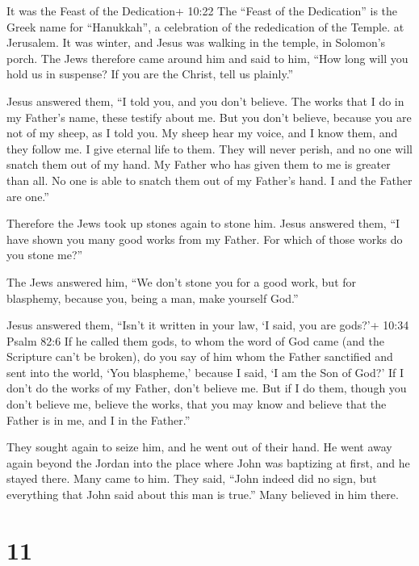 It was the Feast of the Dedication+ 10:22 The ``Feast of
the Dedication'' is the Greek name for ``Hanukkah'', a celebration of
the rededication of the Temple. at Jerusalem.  It was
winter, and Jesus was walking in the temple, in Solomon's porch.
 The Jews therefore came around him and said to him, ``How
long will you hold us in suspense? If you are the Christ, tell us
plainly.''

 Jesus answered them, ``I told you, and you don't believe.
The works that I do in my Father's name, these testify about me.
 But you don't believe, because you are not of my sheep, as
I told you.  My sheep hear my voice, and I know them, and
they follow me.  I give eternal life to them. They will
never perish, and no one will snatch them out of my hand. 
My Father who has given them to me is greater than all. No one is able
to snatch them out of my Father's hand.  I and the Father
are one.''

 Therefore the Jews took up stones again to stone him.
 Jesus answered them, ``I have shown you many good works
from my Father. For which of those works do you stone me?''

 The Jews answered him, ``We don't stone you for a good
work, but for blasphemy, because you, being a man, make yourself God.''

 Jesus answered them, ``Isn't it written in your law, `I
said, you are gods?'+ 10:34 Psalm 82:6  If he called them
gods, to whom the word of God came (and the Scripture can't be broken),
 do you say of him whom the Father sanctified and sent into
the world, `You blaspheme,' because I said, `I am the Son of God?'
 If I don't do the works of my Father, don't believe me.
 But if I do them, though you don't believe me, believe the
works, that you may know and believe that the Father is in me, and I in
the Father.''

 They sought again to seize him, and he went out of their
hand.  He went away again beyond the Jordan into the place
where John was baptizing at first, and he stayed there. 
Many came to him. They said, ``John indeed did no sign, but everything
that John said about this man is true.''  Many believed in
him there.

\hypertarget{section-10}{%
\section{11}\label{section-10}}


